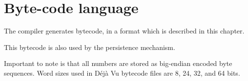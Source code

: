\chapter{Byte-code language}

The compiler generates bytecode, in a format which is described in this
chapter.

This bytecode is also used by the persistence mechanism.

Important to note is that all numbers are stored as big-endian encoded byte sequences. Word sizes used in Déjà Vu bytecode files are 8, 24, 32, and 64 bits.




